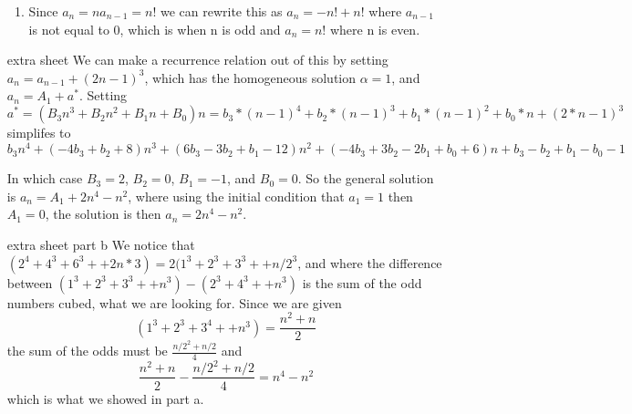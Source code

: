\documentclass{article}
\begin{document}
\begin{enumerate}
\begin{enumerate}
\item
Since $a_n=na_{n-1} = n!$ we can rewrite this as $a_n=-n! + n!$ where $a_{n-1}$ is not equal to 0, which is when n is odd and $a_n=n!$ where n is even. 
\end{enumerate}

\item[extra sheet]
We can make a recurrence relation out of this by setting $a_n = a_{n-1} + (2n-1)^3$, which has the homogeneous solution $\alpha=1$, and $a_n=A_1+a^*$. Setting $a^*=(B_3n^3+B_2n^2+B_1n+B_0)n = b_3*(n-1)^4+b_2*(n-1)^3+b_1*(n-1)^2+b_0*n+(2*n-1)^3$ simplifes to 
\[
b_3n^4+(-4b_3+b_2+8)n^3+(6b_3-3b_2+b_1-12)n^2+(-4b_3+3b_2-2b_1+b_0+6)n+b_3-b_2+b_1-b_0-1
\]

In which case $B_3 = 2$, $B_2=0$, $B_1=-1$, and $B_0=0$. So the general solution is $a_n=A_1+2n^4-n^2$, where using the initial condition that $a_1 = 1$ then $A_1 = 0$, the solution is then $a_n=2n^4-n^2$. 

\item[extra sheet part b]
We notice that $(2^4+4^3+6^3 + +  2n*3) = 2(1^3+2^3+3^3 + + n/2^3$, and where the difference between $(1^3+2^3+3^3+ +n^3) - (2^3+4^3+ + n^3)$ is the sum of the odd numbers cubed, what we are looking for. Since we are given 
\[
(1^3+2^3+3^4 + + n^3) = \frac{n^2+n}{2}
\]
the sum of the odds must be $\frac{n/2^2+n/2}{4}$ and 
\[
\frac{n^2+n}{2} - \frac{n/2^2+n/2}{4} = n^4-n^2
\]
which is what we showed in part a. 
\end{enumerate}
\end{document}
